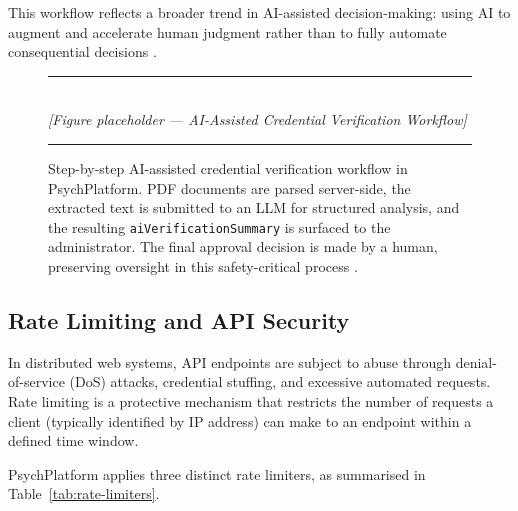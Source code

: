 This workflow reflects a broader trend in AI-assisted decision-making: using AI
to augment and accelerate human judgment rather than to fully automate
consequential decisions \cite{Dellermann2019}.

\begin{figure}[H]
  \centering
  \rule{0.85\textwidth}{0.4pt}\\[6pt]
  {\small\itshape [Figure placeholder — AI-Assisted Credential Verification Workflow]}
  \rule{0.85\textwidth}{0.4pt}
  \caption{Step-by-step AI-assisted credential verification workflow in
           PsychPlatform. PDF documents are parsed server-side, the extracted
           text is submitted to an LLM for structured analysis, and the resulting
           \texttt{aiVerificationSummary} is surfaced to the administrator. The
           final approval decision is made by a human, preserving oversight in
           this safety-critical process \citep{Dellermann2019}.}
  \label{fig:cred-verification}
\end{figure}

\subsection{Rate Limiting and API Security}
\label{subsec:rate-limiting}

In distributed web systems, API endpoints are subject to abuse through
denial-of-service (DoS) attacks, credential stuffing, and excessive automated
requests. Rate limiting is a protective mechanism that restricts the number of
requests a client (typically identified by IP address) can make to an endpoint
within a defined time window.

PsychPlatform applies three distinct rate limiters, as summarised in
Table~\ref{tab:rate-limiters}.

